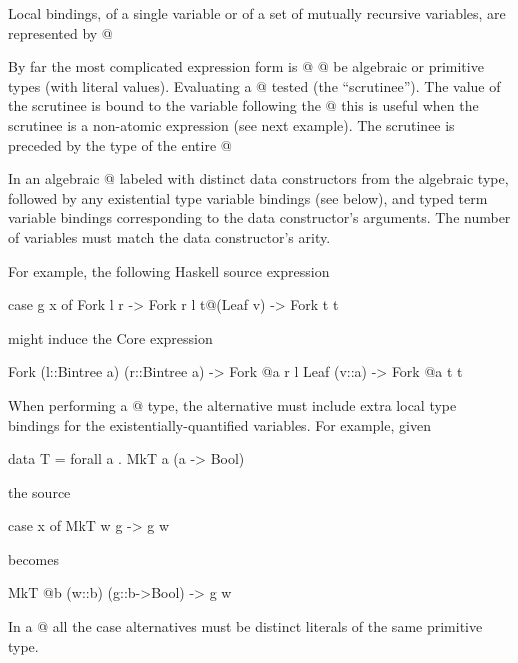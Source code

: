 \documentclass[10pt]{article}
\begin{document}
Local bindings, of a single variable or of a set of mutually recursive variables,
are represented by @%

By far the most complicated expression form is @%
@%
be algebraic or primitive types (with literal values).
Evaluating a @%
tested (the ``scrutinee''). The value of the scrutinee is bound to the variable
following the @%
this is useful when the scrutinee is a non-atomic
expression (see next example). The scrutinee is preceded by the type of the entire @%

In an algebraic @%
labeled with distinct data constructors from the algebraic type, followed by
any existential type variable bindings (see below), and 
typed term variable bindings corresponding to the data constructor's
arguments. The number of variables must match the data constructor's arity.

For example, the following Haskell source expression
\begin{code}
case g x of
  Fork l r -> Fork r l
  t@(Leaf v) -> Fork t t
\end{code}
might induce the Core expression
\begin{code}
   Fork (l::Bintree a) (r::Bintree a) ->
      Fork @a r l
   Leaf (v::a) ->
      Fork @a t t
\end{code}

When performing a @%
type, the alternative must include extra local type bindings 
for the existentially-quantified variables.  For example, given 
\begin{code}
data T = forall a . MkT a (a -> Bool)
\end{code}
the source
\begin{code}
case x of
  MkT w g -> g w
\end{code}
becomes
\begin{code}
  MkT @b (w::b) (g::b->Bool) -> g w
\end{code}

In a @%
all the case alternatives must be distinct literals of the same primitive type.
\end{document}
